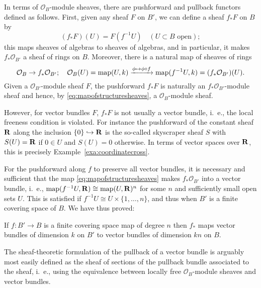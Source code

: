 \documentclass[a4paper,openany]{scrbook}
\begin{document}
In terms of $\mathcal O_B$-module sheaves, there are pushforward and pullback functors defined as follows. First, given any sheaf $F$ on $B'$, we can define a sheaf $f_*F$ on $B$ by
\[
(f_*F)(U) = F(f^{-1}U) \quad (U \subset B \text{ open});
\]
this maps sheaves of algebras to sheaves of algebras, and in particular, it makes $f_*\mathcal O_{B'}$ a sheaf of rings on $B$. Moreover, there is a natural map of sheaves of rings
\begin{equation}\label{eq:mapofstructuresheaves}
\mathcal O_{B} \to f_*\mathcal O_{B'}; \quad \mathcal O_B(U) = \operatorname{map}(U,k) \xrightarrow{\phi \mapsto \phi \circ f} \operatorname{map}(f^{-1}U,k) = (f_*\mathcal O_{B'})(U).
\end{equation}
Given a $\mathcal O_{B'}$-module sheaf $F$, the pushforward $f_*F$ is naturally an $f_*\mathcal O_{B'}$-module sheaf and hence, by \eqref{eq:mapofstructuresheaves}, a $\mathcal O_B$-module sheaf.

However, for vector bundles $F$, $f_*F$ is not usually a vector bundle, i.~e., the local freeness condition is violated. For instance the pushforward of the constant sheaf $\mathbf R$ along the inclusion $\{0\} \hookrightarrow \mathbf R$ is the so-called skyscraper sheaf $S$ with $S(U) = \mathbf R$ if $0 \in U$ and $S(U) = 0$ otherwise. In terms of vector spaces over $\mathbf R$, this is precisely Example~\ref{exa:coordinatecross}.

For the pushforward along $f$ to preserve all vector bundles, it is necessary and sufficient that the map \eqref{eq:mapofstructuresheaves} makes $f_*\mathcal O_{B'}$ into a vector bundle, i.~e., $\operatorname{map}(f^{-1}U,\mathbf R) \cong \operatorname{map}(U,\mathbf R)^n$ for some $n$ and sufficiently small open sets $U$. This is satisfied if $f^{-1}U \cong U \times \{1,\dots,n\}$, and thus when $B'$ is a finite covering space of $B$. We have thus proved:

\begin{thm}\label{thm:covpushforward}
If $f\colon B' \to B$ is a finite covering space map of degree $n$ then $f_*$ maps vector bundles of dimension $k$ on $B'$ to vector bundles of dimension $kn$ on $B$.
\end{thm}

The sheaf-theoretic formulation of the pullback of a vector bundle is arguably most easily defined as the sheaf of sections of the pullback bundle associated to the sheaf, i.~e., using the equivalence between locally free $\mathcal O_B$-module sheaves and vector bundles.
\end{document}
